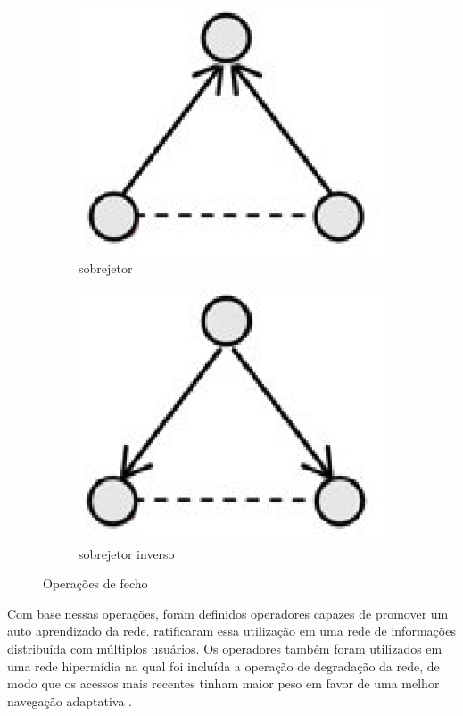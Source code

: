 \begin{figure}
\begin{subfigure}{.25\textwidth}
  		\includegraphics[width=.9\linewidth]{figuras/opfecho_c.eps}
  		\caption{sobrejetor}
  		\label{fig:subop3}
	\end{subfigure}%
		\begin{subfigure}{.25\textwidth}
  		\centering
  		\includegraphics[width=.9\linewidth]{figuras/opfecho_d.eps}
  		\caption{sobrejetor inverso}
  		\label{fig:subop4}
	\end{subfigure}
	\caption{Operações de fecho}
	\label{fig:opfecho}
\end{figure}

Com base nessas operações, foram definidos operadores capazes de promover um auto aprendizado da rede. \cite{bollen1996} ratificaram essa utilização em uma rede de informações distribuída com múltiplos usuários. Os operadores também foram utilizados em uma rede hipermídia na qual foi incluída a operação de degradação da rede, de modo que os acessos mais recentes tinham maior peso em favor de uma melhor navegação adaptativa \cite{palazzo2000}.

